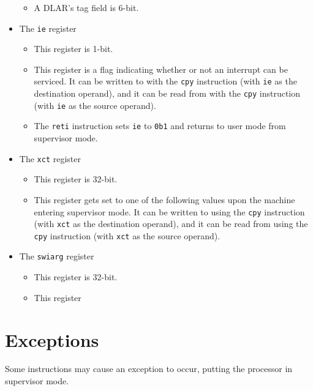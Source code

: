 \documentclass{article}
\begin{document}
\begin{itemize}
\begin{itemize}
		\item A DLAR's tag field is 6-bit.
		\end{itemize}

	\item The \texttt{ie} register
		\begin{itemize}
		\item This register is 1-bit.

		\item This register is a flag indicating whether or not an
		interrupt can be serviced.  It can be written to with the
		\texttt{cpy} instruction (with \texttt{ie} as the destination
		operand), and it can be read from with the \texttt{cpy} instruction
		(with \texttt{ie} as the source operand).

		\item The \texttt{reti} instruction sets \texttt{ie} to
		\texttt{0b1} and returns to user mode from supervisor mode.
		\end{itemize}

	\item The \texttt{xct} register
		\begin{itemize}
		\item This register is 32-bit.

		\item This register gets set to one of the following values upon
		the machine entering supervisor mode.  It can be written to using
		the \texttt{cpy} instruction (with \texttt{xct} as the destination
		operand), and it can be read from using the \texttt{cpy}
		instruction (with \texttt{xct} as the source operand).
		\end{itemize}

	\item The \texttt{swiarg} register
		\begin{itemize}
		\item This register is 32-bit.

		\item This register
		\end{itemize}
	\end{itemize}
	\newpage

\section{Exceptions}
	Some instructions may cause an exception to occur, putting the
	processor in supervisor mode.
\end{document}
